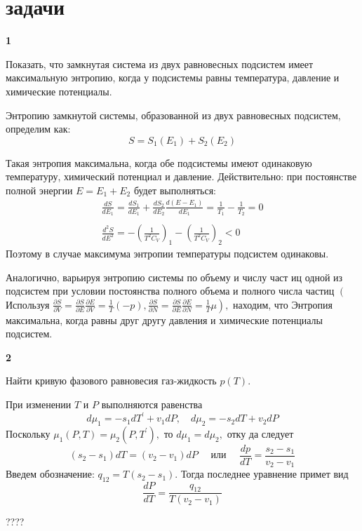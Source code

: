 \documentclass[a4paper,12pt]{article} %
\begin{document}
\clearpage
\part{задачи}



\begin{ttask}\textbf{1}


Показать, что замкнутая система из двух равновесных подсистем имеет максимальную энтропию, 
когда у подсистемы равны температура, давление и химические потенциалы.


Энтропию замкнутой системы, образованной из двух равновесных подсистем, определим как:
$$
S=S_{1}\left(E_{1}\right)+S_{2}\left(E_{2}\right)
$$


Такая энтропия максимальна, когда обе подсистемы имеют одинаковую температуру, химический потенциал и давление.
Действительно:
при постоянстве полной энергии $E=E_{1}+E_{2}$ будет выполняться:
{\Large $$
	\begin{array}{c}
	\frac{d S}{d E_{1}}=\frac{d S_{1}}{d E_{1}}+\frac{d S_{2}}{d E_{2}} \frac{d\left(E-E_{1}\right)}{d E_{1}}=\frac{1}{T_{1}}-\frac{1}{T_{2}}=0 \\ \\
	\frac{d^{2} S}{d E^{2}}=-\left(\frac{1}{T^{2} C_{V}}\right)_{1}-\left(\frac{1}{T^{2} C_{V}}\right)_{2}<0
	\end{array}
	$$}
Поэтому в случае максимума энтропии температуры подсистем одинаковы.

Аналогично, варьируя энтропию системы по объему и числу част иц одной из подсистем при условии постоянства полного объема и полного числа частиц 
$\left(\right.$ Используя $\left.\frac{\partial S}{\partial V}=
\frac{\partial S}{\partial E} \frac{\partial E}{\partial V}=\frac{1}{T}(-p), \frac{\partial S}{\partial N}=
\frac{\partial S}{\partial E} \frac{\partial E}{\partial N}=
\frac{1}{T} \mu\right),$ находим, что Энтропия
максимальна, когда равны друг другу давления и химические потенциалы подсистем.



\end{ttask}


\begin{ttask} \textbf{2}

Найти кривую фазового равновесия газ-жидкость $ p(T) $.


При изменении $T$ и $P$ выполняются равенства
$$
d \mu_{1}=-s_{1} d T^{\prime}+v_{1} d P, \quad d \mu_{2}=-s_{2} d T+v_{2} d P
$$
Поскольку $\mu_{1}(P, T)=\mu_{2}\left(P, T^{\prime}\right),$ то $d \mu_{1}=d \mu_{2},$ отку да следует
$$
\left(s_{2}-s_{1}\right) d T=\left(v_{2}-v_{1}\right) d P \quad \text { или } \quad \frac{d p}{d T}=\frac{s_{2}-s_{1}}{v_{2}-v_{1}}
$$
Введем обозначение: $q_{12}=T\left(s_{2}-s_{1}\right) .$ Тогда последнее уравнение примет вид
$$
\frac{d P}{d T}=
\frac{q_{12}}{T\left(v_{2}-v_{1}\right)}
$$


????



\end{ttask}
\end{document}
